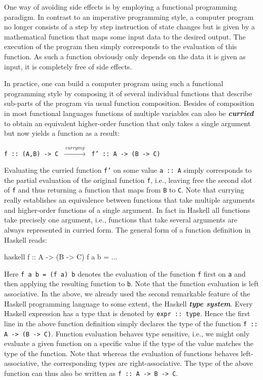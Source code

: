 One way of avoiding side effects is by employing a functional programming paradigm. In contrast to an imperative programming style, a computer program no longer consists of a step by step instruction of state changes but is given by a mathematical function that maps some input data to the desired output. The execution of the program then simply corresponds to the evaluation of this function. As such a function obviously only depends on the data it is given as input, it is completely free of side effects.

In practice, one can build a computer program using such a functional programming style by composing it of several individual functions that describe sub-parts of the program via usual function composition. Besides of composition in most functional languages functions of multiple variables can also be  \textit{\textbf{curried}} to obtain an equivalent higher-order function that only takes a single argument but now yields a function as a result:
\begin{center}
    \texttt{f :: (A,B) -> C} $\ \xrightarrow{ \ currying \ } \ $
    \texttt{f' :: A -> (B -> C)}
\end{center}
Evaluating the curried function \texttt{f'} on some value \texttt{a :: A} simply corresponds to the partial evaluation of the original function \texttt{f}, i.e., leaving free the second slot of \texttt{f} and thus returning a function that maps from \texttt{B}  to \texttt{C}. Note that currying really establishes an equivalence between functions that take multiple arguments and higher-order functions of a single argument.
In fact in Haskell all functions take precisely one argument, i.e., functions that take several arguments are always represented in curried form. The general form of a function definition in Haskell reads:
\begin{center}
\begin{cminted}{haskell}
f :: A -> (B -> C)
f a b = ...  
\end{cminted}
\end{center}
Here
\texttt{f a b = (f a) b} denotes the evaluation of the function \texttt{f} first on \texttt{a} and then applying the resulting function to \texttt{b}. Note that the function evaluation is left associative.
In the above, we already used the second remarkable feature of the  Haskell programming language to some extent, the Haskell \textbf{\textit{type system}}. Every Haskell expression has a type that is denoted by \texttt{expr :: type}. Hence the first line in the above function definition simply declares   the type of the function \texttt{f :: A -> (B -> C)}.
Function evaluation behaves type sensitive, i.e., we might only evaluate a given function on a specific value if the type of the value matches the type of the function.
Note that whereas the evaluation of functions behaves left-associative, the corresponding types are right-associative. The type of the above function can thus also be written as \texttt{f :: A -> B -> C}.

